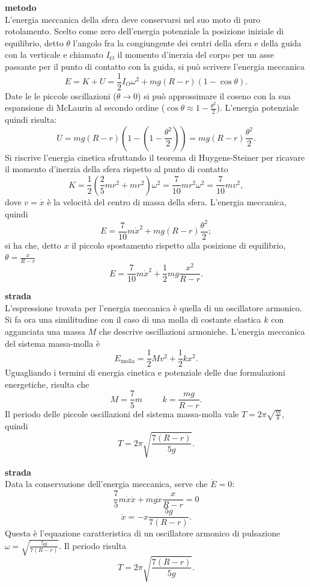 \documentclass[a4paper,12pt]{article}
\begin{document}
\textbf{ metodo} \\
L'energia meccanica della sfera deve conservarsi nel suo moto di puro rotolamento. Scelto come zero dell'energia potenziale la posizione iniziale di equilibrio, detto $\theta$ l'angolo fra la congiungente dei centri della sfera e della guida con la verticale e chiamato $I_O$ il momento d'inerzia del corpo per un asse passante per il punto di contatto con la guida, si può scrivere l'energia meccanica
\[
E = K + U = \frac{1}{2}I_O \omega^2 + mg(R-r)(1-\cos\theta). \tag{1.0}
\]
Date le le piccole oscillazioni ($\theta \rightarrow 0$) si può approssimare il coseno con la sua espansione di McLaurin al secondo ordine ($\cos \theta \approx 1 - \frac{\theta^2}{2}$). L'energia potenziale quindi risulta:
\[
U = mg(R-r)\left(1-\left(1-\frac{\theta^2}{2}\right)\right) = mg(R-r)\frac{\theta^2}{2}. \tag{1.1}
\]
Si riscrive l'energia cinetica sfruttando il teorema di Huygens-Steiner per ricavare il momento d'inerzia della sfera rispetto al punto di contatto 
\[
K = \frac{1}{2}\left(\frac{2}{5}mr^2 + mr^2\right)\omega^2 = \frac{7}{10}mr^2 \omega^2 = \frac{7}{10}mv^2, \tag{1.2}
\]
dove $v = \dot{x}$ è la velocità del centro di massa della sfera. L'energia meccanica, quindi
\[
E = \frac{7}{10}m\dot{x}^2 + mg(R-r)\frac{\theta^2}{2}; \tag{1.3}
\]
si ha che, detto $x$ il piccolo spostamento rispetto alla posizione di equilibrio, $\theta = \frac{x}{R-r}$ 
\[
E = \frac{7}{10}m\dot{x}^2 + \frac{1}{2}mg\frac{x^2}{R-r}. \tag{1.4} \label{en_mec}
\]

\noindent
\textbf{ strada} \\
L'espressione trovata per l'energia meccanica è quella di un oscillatore armonico. Si fa ora una similitudine con il caso di una molla di costante elastica $k$ con agganciata una massa $M$ che descrive oscillazioni armoniche. L'energia meccanica del sistema massa-molla è
\[
E_{\text{molla}} = \frac{1}{2}Mv^2 + \frac{1}{2}kx^2.  \tag{1.5}
\] 
Uguagliando i termini di energia cinetica e potenziale delle due formulazioni energetiche, risulta che 
\[
M = \frac{7}{5}m \hspace{1cm} k = \frac{mg}{R-r}. \tag{1.6}
\]
Il periodo delle piccole oscillazioni del sistema massa-molla vale $T = 2\pi \sqrt{\frac{m}{k}}$, quindi  
\[
T = 2\pi \sqrt{\frac{7(R-r)}{5g}}. \tag{1.7}
\]

\noindent
\textbf{ strada} \\
Data la conservazione dell'energia meccanica, serve che $\dot{E} = 0$:
\[
\frac{7}{5}m\dot{x}\ddot{x} + mg\dot{x}\frac{x}{R-r} = 0 \tag{1.8}
\]
\[
 \ddot{x} = -x\frac{5g}{7(R-r)}. \tag{1.9} \label{moto_arm}
\]
Questa è l'equazione caratteristica di un oscillatore armonico di pulsazione $\omega = \sqrt{\frac{5g}{7(R-r)}}$. Il periodo risulta  
\[
T = 2\pi \sqrt{\frac{7(R-r)}{5g}}. \tag{1.10}
\]
\end{document}
